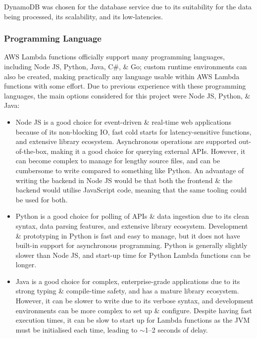 \documentclass[a4paper,11pt]{report}
\begin{document}
DynamoDB was chosen for the database service due to its suitability for the data being processed, its scalability, and its low-latencies.

\subsubsection{Programming Language}
AWS Lambda functions officially support many programming languages, including Node JS, Python, Java, C\#, \& Go;
custom runtime environments can also be created, making practically any language usable within AWS Lambda functions with some effort.
Due to previous experience with these programming languages, the main options considered for this project were Node JS, Python, \& Java:
\begin{itemize}
    \item   Node JS\supercite{node} is a good choice for event-driven \& real-time web applications because of its non-blocking IO, fast cold starts for latency-sensitive functions, and extensive library ecosystem.
            Asynchronous operations are supported out-of-the-box, making it a good choice for querying external APIs.
            However, it can become complex to manage for lengthy source files, and can be cumbersome to write compared to something like Python.
            An advantage of writing the backend in Node JS would be that both the frontend \& the backend would utilise JavaScript code, meaning that the same tooling could be used for both.

    \item   Python\supercite{python} is a good choice for polling of APIs \& data ingestion due to its clean syntax, data parsing features, and extensive library ecosystem.
            Development \& prototyping in Python is fast and easy to manage, but it does not have built-in support for asynchronous programming.
            Python is generally slightly slower than Node JS, and start-up time for Python Lambda functions can be longer.

    \item   Java\supercite{java} is a good choice for complex, enterprise-grade applications due to its strong typing \& compile-time safety, and has a mature library ecosystem.
            However, it can be slower to write due to its verbose syntax, and development environments can be more complex to set up \& configure.
            Despite having fast execution times, it can be slow to start up for Lambda functions as the JVM must be initialised each time, leading to $\sim$1--2 seconds of delay.
\end{itemize}
\end{document}

